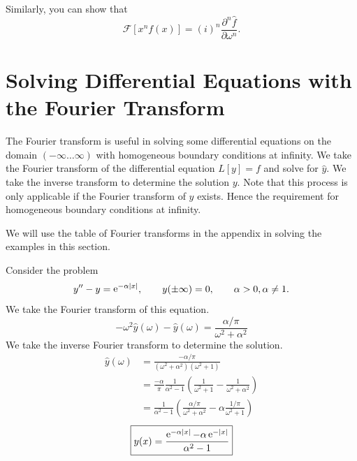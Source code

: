 Similarly, you can show that
\[ 
\boxed{
  \mathcal{F}[x^n f(x)] = (i)^n \frac{\partial^n \hat{f}}{\partial \omega^n}.
  } 
\]














\section{Solving Differential Equations with the Fourier Transform}


The Fourier transform is useful in solving some differential equations on
the domain $(-\infty \ldots \infty)$ with homogeneous boundary conditions at infinity.  
We take the Fourier transform of the differential equation 
$L[y] = f$ and solve for $\hat{y}$.  We take the inverse transform to 
determine the solution $y$.  Note that this process is only applicable if
the Fourier transform of $y$ exists.  Hence the requirement for homogeneous
boundary conditions at infinity.  

We will use the table of Fourier transforms in the appendix 
in solving the examples in this section.











\begin{Example}
  Consider the problem
  \[ 
  y'' - y = \mathop{\mathrm{e}}\nolimits^{-\alpha |x|}, \qquad y(\pm \infty) = 0, \qquad \alpha > 0, \alpha \neq 1.
  \]
  We take the Fourier transform of this equation.
  \[
  -\omega^2 \hat{y}(\omega) - \hat{y}(\omega) = \frac{\alpha / \pi}{\omega^2 + \alpha^2}
  \]
  We take the inverse Fourier transform to determine the solution.
  \begin{align*}
    \hat{y}(\omega)
    &= \frac{-\alpha/ \pi}{(\omega^2+\alpha^2)(\omega^2+1)} 
    \\
    &= \frac{-\alpha}{\pi} \frac{1}{\alpha^2-1} \left(
      \frac{1}{\omega^2 + 1} - \frac{1}{\omega^2 + \alpha^2} \right) 
    \\
    &= \frac{1}{\alpha^2 - 1} \left( \frac{\alpha / \pi}{\omega^2 + \alpha^2}
      - \alpha \frac{1/\pi}{\omega^2 + 1} \right)
  \end{align*}
  \[ 
  \boxed{ 
    y(x) = \frac{\mathop{\mathrm{e}}\nolimits^{-\alpha |x|} - \alpha \mathop{\mathrm{e}}\nolimits^{-|x|}}{\alpha^2-1}
    }
  \]
\end{Example}













